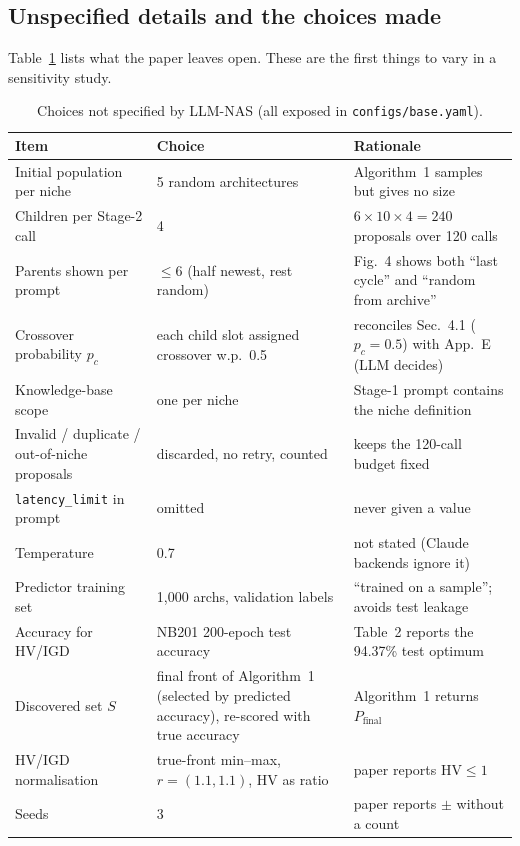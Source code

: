 \documentclass[11pt,a4paper]{article}
\newcommand{\code}[1]{\texttt{#1}}
\newcommand{\HV}{\mathrm{HV}}
\begin{document}
\subsection{Unspecified details and the choices made}\label{sec:assumed}
Table~\ref{tab:assumed} lists what the paper leaves open. These are the first things to vary in a sensitivity study.
\begin{table}[h]\centering\small
\caption{Choices not specified by LLM-NAS (all exposed in \code{configs/base.yaml}).}\label{tab:assumed}
\begin{tabular}{p{4.6cm}p{4.0cm}p{6.2cm}}
\toprule
Item & Choice & Rationale \\
\midrule
Initial population per niche & 5 random architectures & Algorithm~1 samples but gives no size \\
Children per Stage-2 call & 4 & $6\times10\times4=240$ proposals over 120 calls \\
Parents shown per prompt & $\le6$ (half newest, rest random) & Fig.~4 shows both ``last cycle'' and ``random from archive'' \\
Crossover probability $p_c$ & each child slot assigned crossover w.p.\ 0.5 & reconciles Sec.~4.1 ($p_c{=}0.5$) with App.~E (LLM decides) \\
Knowledge-base scope & one per niche & Stage-1 prompt contains the niche definition \\
Invalid / duplicate / out-of-niche proposals & discarded, no retry, counted & keeps the 120-call budget fixed \\
\code{latency\_limit} in prompt & omitted & never given a value \\
Temperature & 0.7 & not stated (Claude backends ignore it) \\
Predictor training set & 1{,}000 archs, validation labels & ``trained on a sample''; avoids test leakage \\
Accuracy for HV/IGD & NB201 200-epoch test accuracy & Table~2 reports the 94.37\% test optimum \\
Discovered set $S$ & final front of Algorithm~1 (selected by predicted accuracy), re-scored with true accuracy & Algorithm~1 returns $P_{\text{final}}$ \\
HV/IGD normalisation & true-front min--max, $r=(1.1,1.1)$, HV as ratio & paper reports $\HV\le1$ \\
Seeds & 3 & paper reports $\pm$ without a count \\
\bottomrule
\end{tabular}
\end{table}
\end{document}
